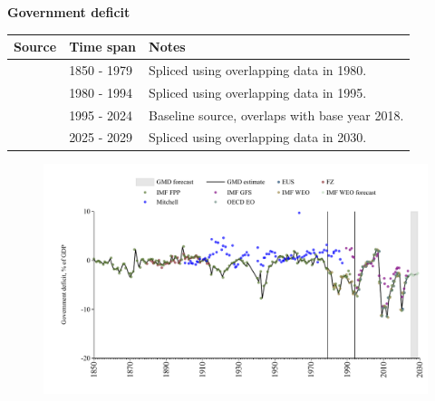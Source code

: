 \documentclass[12pt,a4paper,landscape]{article}
\begin{document}
\begin{adjustbox}{max totalsize={\paperwidth}{\paperheight},center}
\begin{minipage}[t][\textheight][t]{\textwidth}
\vspace*{0.5cm}
{}
\begin{center}
{\Large\bfseries Government deficit}
\end{center}
\vspace{0.5cm}
\begin{table}[H]
\centering
\small
\begin{tabular}{|l|l|l|}
\hline
\textbf{Source} & \textbf{Time span} & \textbf{Notes} \\
\hline
\rowcolor{white}\cite{IMF_FPP}& 1850 - 1979 &Spliced using overlapping data in 1980. \\
\rowcolor{lightgray}\cite{IMF_WEO}& 1980 - 1994 &Spliced using overlapping data in 1995. \\
\rowcolor{white}\cite{EUS}& 1995 - 2024 &Baseline source, overlaps with base year 2018. \\
\rowcolor{lightgray}\cite{IMF_WEO_forecast}& 2025 - 2029 &Spliced using overlapping data in 2030. \\
\hline
\end{tabular}
\end{table}
\begin{figure}[H]
\centering
\includegraphics[width=\textwidth,height=0.6\textheight,keepaspectratio]{graphs/ESP_govdef_GDP.pdf}
\end{figure}
\end{minipage}
\end{adjustbox}
\end{document}
